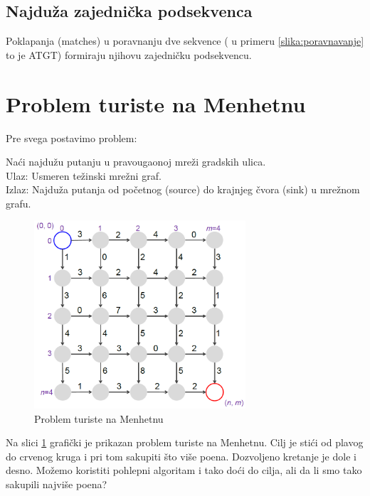 \subsection{Najduža zajednička podsekvenca}

Poklapanja (matches) u poravnanju dve sekvence ( u primeru \ref{slika:poravnavanje} to je ATGT) formiraju njihovu zajedničku podsekvencu.


\section{Problem turiste na Menhetnu}

\noindent Pre svega postavimo problem:\\

\begin{problem}
	Naći najdužu putanju u pravougaonoj mreži gradskih ulica. \\
	Ulaz: Usmeren težinski mrežni graf. \\
	Izlaz: Najduža putanja od početnog (source) do krajnjeg čvora (sink) u mrežnom grafu. 
\end{problem}

\begin{figure}[h!]
\centering
\includegraphics[width=0.7\textwidth]{poglavlja/5/slike/menhetn2.png}
\caption{Problem turiste na Menhetnu}
\label{slika:menhetn}
\end{figure} 

Na slici \ref{slika:menhetn} grafički je prikazan problem turiste na Menhetnu. Cilj je stići od plavog do crvenog kruga i pri tom sakupiti što više poena. Dozvoljeno kretanje je dole i desno. Možemo koristiti pohlepni algoritam i tako doći do cilja, ali da li smo tako sakupili najviše poena?

